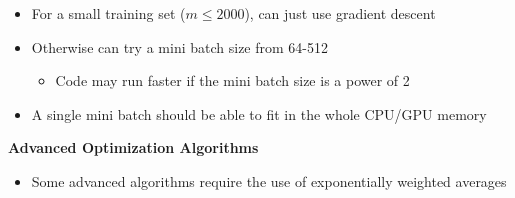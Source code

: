 \documentclass[12pt, letterpaper]{article}
\begin{document}
\begin{itemize}
\begin{itemize}
        \end{itemize}
        \item For a small training set ($m\leq 2000$), can just use gradient descent
        \item Otherwise can try a mini batch size from 64-512
        \begin{itemize}
            \item Code may run faster if the mini batch size is a power of 2
        \end{itemize}
        \item A single mini batch should be able to fit in the whole CPU/GPU memory
    \end{itemize}

    \vspace{5mm}
    \textbf{Advanced Optimization Algorithms}
    \begin{itemize}
        \item Some advanced algorithms require the use of exponentially weighted averages
    \end{itemize}
    
\end{document}

